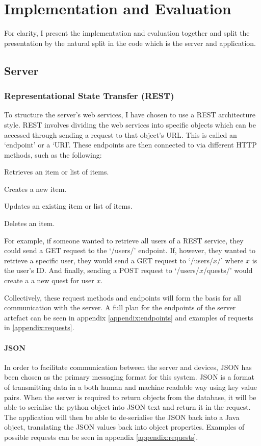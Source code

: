 \chapter{Implementation and Evaluation}

For clarity, I present the implementation and evaluation together and split the presentation by the natural split in the code which is the server and application.

\section{Server}
\subsection{Representational State Transfer (REST)}
To structure the server's web services, I have chosen to use a REST architecture style.
REST involves dividing the web services into specific objects which can be accessed through sending a request to that object's URL. 
This is called an `endpoint' or a `URI'.
These endpoints are then connected to via different HTTP methods, such as the following:
\begin{description}[align=left]
	\item [GET] Retrieves an item or list of items.
	\item [POST] Creates a new item.
	\item [PUT] Updates an existing item or list of items.
	\item [DELETE] Deletes an item. 
\end{description}
For example, if someone wanted to retrieve all users of a REST service, they could send a GET request to the `/users/' endpoint. 
If, however, they wanted to retrieve a specific user, they would send a GET request to `/users/$x$/' where $x$ is the user's ID.
And finally, sending a POST request to `/users/$x$/quests/' would create a a new quest for user $x$.

Collectively, these request methods and endpoints will form the basis for all communication with the server. 
A full plan for the endpoints of the server artefact can be seen in appendix \ref{appendix:endpoints} and examples of requests in \ref{appendix:requests}.

\subsubsection{JSON}
In order to facilitate communication between the server and devices, JSON has been chosen as the primary messaging format for this system.
JSON is a format of transmitting data in a both human and machine readable way using key value pairs.
When the server is required to return objects from the database, it will be able to serialise the python object into JSON text and return it in the request.
The application will then be able to de-serialise the JSON back into a Java object, translating the JSON values back into object properties.
Examples of possible requests can be seen in appendix \ref{appendix:requests}.

